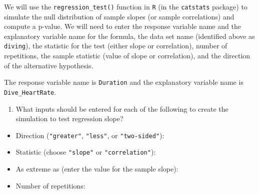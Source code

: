 \documentclass[
]{report}
\providecommand{\tightlist}{%
  \setlength{\itemsep}{0pt}\setlength{\parskip}{0pt}}
\begin{document}
\vspace{1in}

We will use the \texttt{regression\_test()} function in \texttt{R} (in the \texttt{catstats} package) to simulate the null distribution of sample slopes (or sample correlations) and compute a p-value. We will need to enter the response variable name and the explanatory variable name for the formula, the data set name (identified above as \texttt{diving}), the statistic for the test (either slope or correlation), number of repetitions, the sample statistic (value of slope or correlation), and the direction of the alternative hypothesis.

The response variable name is \texttt{Duration} and the explanatory variable name is \texttt{Dive\_HeartRate}.

\begin{enumerate}
\def\labelenumi{\arabic{enumi}.}
\setcounter{enumi}{9}
\tightlist
\item
  What inputs should be entered for each of the following to create the simulation to test regression slope?
\end{enumerate}

\vspace{.5 mm}

\begin{itemize}
\tightlist
\item
  Direction (\texttt{"greater"}, \texttt{"less"}, or \texttt{"two-sided"}):
\end{itemize}

\vspace{.2in}

\begin{itemize}
\tightlist
\item
  Statistic (choose \texttt{"slope"} or \texttt{"correlation"}):
\end{itemize}

\vspace{.2in}

\begin{itemize}
\tightlist
\item
  As extreme as (enter the value for the sample slope):
\end{itemize}

\vspace{0.2in}

\begin{itemize}
\tightlist
\item
  Number of repetitions:
\end{itemize}
\end{document}
